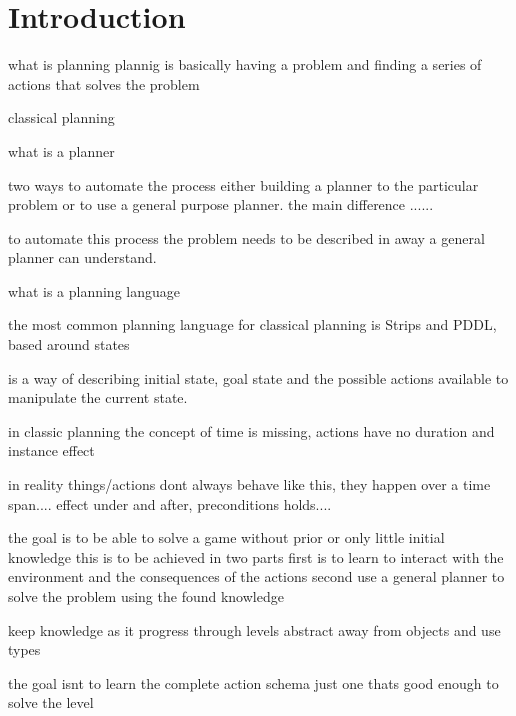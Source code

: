 \section{Introduction}

	what is planning
	plannig is basically having a problem and finding a series of actions that solves the problem
	
	classical planning
		
	what is a planner	

	two ways to automate the process either building a planner to the particular problem or to use a general purpose planner. the main difference ......
	
	   
		
	to automate this process the problem needs to be described in away a general planner can understand.

	what is a planning language 

	the most common planning language for classical planning is Strips and PDDL, based around states  
	
	is a way of describing initial state, goal state and the possible actions available to manipulate the current state.
		
	


	in classic planning  the concept of time is missing, actions have no duration and instance effect

	in reality things/actions dont always behave like this, they happen over a time span.... effect under and after, preconditions holds....


	the goal is to be able to solve a game without prior or only little initial knowledge
	this is to be achieved in two parts
	first is to learn to interact with the environment and the consequences of the actions 
	second use a general planner to solve the problem using the found knowledge
	
	keep knowledge as it progress through levels
	abstract away from objects and use types
	
	the goal isnt to learn the complete action schema just one thats good enough to solve the level


